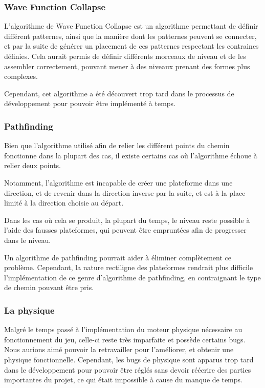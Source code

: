 \documentclass[10pt]{report}
\begin{document}
\subsubsection{Wave Function Collapse}

L'algorithme de Wave Function Collapse est un algorithme permettant de définir différent patternes, ainsi que la
manière dont les patternes peuvent se connecter, et par la suite de générer un placement de ces patternes respectant
les contraines définies.
Cela aurait permis de définir différents morceaux de niveau et de les assembler correctement, pouvant mener à des
niveaux prenant des formes plus complexes.

Cependant, cet algorithme a été découvert trop tard dans le processus de développement pour pouvoir être implémenté
à temps.

\subsubsection{Pathfinding}

Bien que l'algorithme utilisé afin de relier les différent points du chemin fonctionne dans la plupart des cas, il
existe certains cas où l'algorithme échoue à relier deux points.

Notamment, l'algorithme est incapable de créer une plateforme dans une direction, et de revenir dans
la direction inverse par la suite, et est à la place limité à la direction choisie au départ.

Dans les cas où cela se produit, la plupart du temps, le niveau reste possible à l'aide des fausses plateformes,
qui peuvent être empruntées afin de progresser dans le niveau.

Un algorithme de pathfinding pourrait aider à éliminer complètement ce problème.
Cependant, la nature rectiligne des plateformes rendrait plus difficile l'implémentation de ce genre d'algorithme
de pathfinding, en contraignant le type de chemin pouvant être pris.

\subsubsection{La physique}

Malgré le temps passé à l'implémentation du moteur physique nécessaire au fonctionnement du jeu, celle-ci reste très imparfaite et possède certains bugs.\\
Nous aurions aimé pouvoir la retravailler pour l'améliorer, et obtenir une physique fonctionnelle.
Cependant, les bugs de physique sont apparus trop tard dans le développement pour pouvoir être réglés sans devoir réécrire des parties importantes du projet, ce qui était impossible à cause du manque de temps.

\tableofcontents
\end{document}
